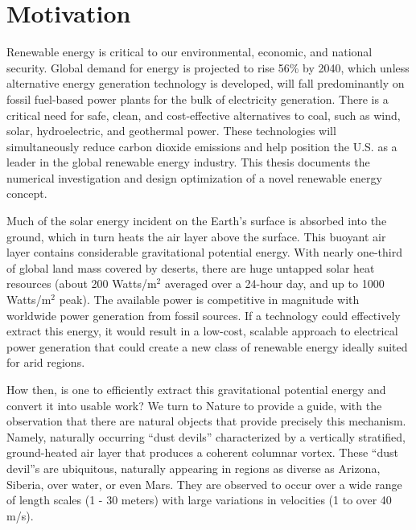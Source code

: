 \label{sec:intro}

%
%


\section{Motivation}

Renewable energy is critical to our environmental, economic, and
national security. Global demand for energy is projected to rise 56\% by
2040\cite{energy-outlook}, which unless alternative energy generation 
technology is developed, will fall predominantly on 
fossil fuel-based power plants for the bulk of electricity generation. 
There is a critical need for safe, clean, and  
cost-effective alternatives to coal, such as wind, solar, hydroelectric,
and geothermal power. These technologies will simultaneously reduce
carbon dioxide emissions and help position the U.S. as a leader in the
global renewable energy industry.
%
This thesis documents the numerical 
investigation and design optimization of a novel renewable energy concept. 

Much of the solar energy incident on the Earth's surface is absorbed
into the ground, which in turn heats the air layer above the surface.
This buoyant air layer contains considerable gravitational potential
energy. 
With nearly one-third of global land mass covered by deserts, there are huge
untapped solar heat resources (about 200 Watts/$\text{m}^2$
averaged over a 24-hour day, and up to 1000 Watts/$\text{m}^2$
peak)\cite{Hoyt197827}. The available power is competitive in magnitude
with worldwide power generation from fossil sources. If a technology
could effectively extract this energy, it would result in a low-cost,
scalable approach to electrical power generation that could create a new
class of renewable energy ideally suited for arid regions.  

How then, is one to efficiently extract this gravitational potential
energy and convert it into usable work? We turn to Nature to provide a 
guide, with the observation that there are natural objects that provide
precisely this mechanism. Namely, naturally occurring ``dust devils'' 
characterized by a vertically stratified, ground-heated air layer
that produces a coherent columnar vortex. These ``dust devil''s are
ubiquitous, naturally appearing in regions as diverse as Arizona,
Siberia, over water, or even
Mars\cite{Sinclair1969,ROG:ROG1635,JGRE:JGRE1660}.  
They are observed to occur over a wide range of length scales (1 - 30
meters) with large variations in velocities (1 to over 40
m/s)\cite{Sinclair1969}. 

